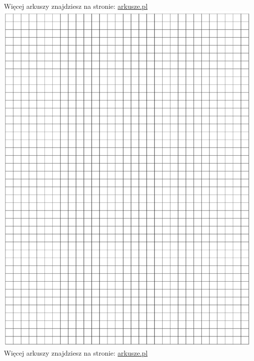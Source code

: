 \documentclass[10pt]{article}
\begin{document}
Więcej arkuszy znajdziesz na stronie: \href{http://arkusze.pl}{arkusze.pl}\\
\includegraphics[max width=\textwidth, center]{2024_11_21_a7a52c0c0974ad42b88bg-14}\\
Więcej arkuszy znajdziesz na stronie: \href{http://arkusze.pl}{arkusze.pl}\\
\end{document}
